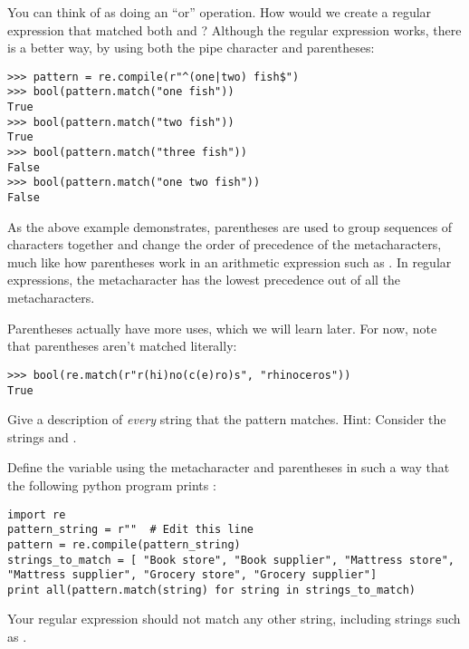 You can think of  as doing an ``or'' operation.
How would we create a regular expression that matched both  and ?
Although the regular expression  works, there is a better way, by using both the pipe character and parentheses:
\begin{lstlisting}
>>> pattern = re.compile(r"^(one|two) fish$")
>>> bool(pattern.match("one fish"))
True
>>> bool(pattern.match("two fish"))
True
>>> bool(pattern.match("three fish"))
False
>>> bool(pattern.match("one two fish"))
False
\end{lstlisting}
As the above example demonstrates, parentheses are used to group sequences of characters together and change the order of precedence of the metacharacters, much like how parentheses work in an arithmetic expression such as . In regular expressions, the  metacharacter has the lowest precedence out of all the metacharacters.

Parentheses actually have more uses, which we will learn later.
For now, note that parentheses aren't matched literally:
\begin{lstlisting}
>>> bool(re.match(r"r(hi)no(c(e)ro)s", "rhinoceros"))
True
\end{lstlisting}

\begin{problem}
Give a description of \emph{every} string that the pattern  matches. Hint: Consider the strings  and .
\end{problem}

\begin{problem}
Define the variable  using the metacharacter  and parentheses in such a way that the following python program prints :

\begin{lstlisting}
import re
pattern_string = r""  # Edit this line
pattern = re.compile(pattern_string)
strings_to_match = [ "Book store", "Book supplier", "Mattress store", "Mattress supplier", "Grocery store", "Grocery supplier"]
print all(pattern.match(string) for string in strings_to_match)
\end{lstlisting}
Your regular expression should not match any other string, including strings such as .
\end{problem}

